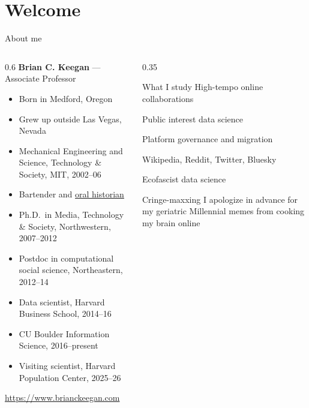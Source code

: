 \documentclass[9pt,aspectratio=169]{beamer}
\begin{document}
\section{Welcome}

\begin{frame}{About me}
    \begin{columns}[T]
        \begin{column}{0.6\textwidth}
            \textbf{Brian C. Keegan} --- Associate Professor
            \begin{itemize}\small
                \item Born in Medford, Oregon
                \item Grew up outside Las Vegas, Nevada
                \item Mechanical Engineering and Science, Technology \& Society, MIT, 2002--06
                \item Bartender and \href{https://infinite.mit.edu/collection/mit-150-interviews/}{oral historian}
                \item Ph.D.\ in Media, Technology \& Society, Northwestern, 2007--2012
                \item Postdoc in computational social science, Northeastern, 2012--14
                \item Data scientist, Harvard Business School, 2014--16
                \item CU Boulder Information Science, 2016--present
                \item Visiting scientist, Harvard Population Center, 2025--26
            \end{itemize}
            \medskip
            \url{https://www.brianckeegan.com}
        \end{column}
        \begin{column}{0.35\textwidth}
            \begin{block}{What I study}
                \small
                 High-tempo online collaborations

                 \medskip
                 Public interest data science

                 \medskip
                 Platform governance and migration

                 \medskip
                 Wikipedia, Reddit, Twitter, Bluesky

                 \medskip
                 Ecofascist data science
            \end{block}

            \begin{block}{Cringe-maxxing}\small
                I apologize in advance for my geriatric Millennial memes from cooking my brain online
            \end{block}
        \end{column}
    \end{columns}
\end{frame}
\end{document}
